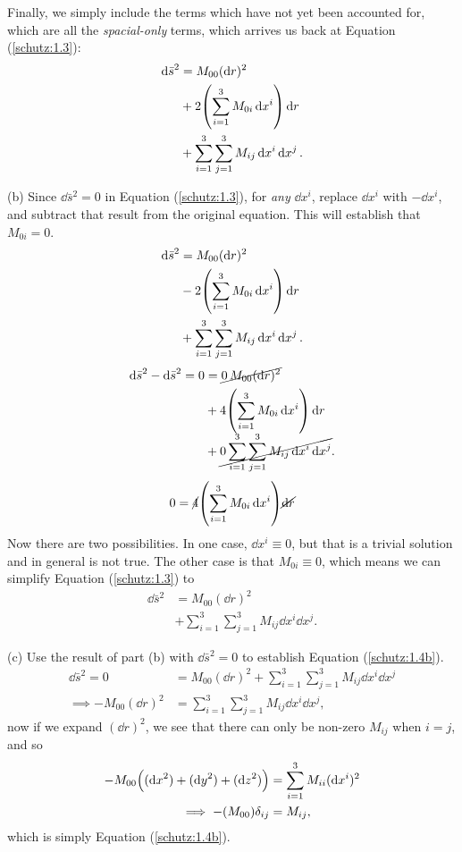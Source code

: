 \documentclass[gr-notes.tex]{subfiles}
\begin{document}
Finally, we simply include the terms which have not yet been accounted for, which are all the \emph{spacial-only} terms, which arrives us back at Equation (\ref{schutz:1.3}):
%
\begin{align*}
  \dd{\bar{s}}^2 &=
  M_{00} (\dd{r})^2
  \\ &+
  2 \qty( \sum_{i=1}^3 M_{0i} \dd{x^i} ) \dd{r}
  \\ &+
  \sum_{i=1}^3 \sum_{j=1}^3 M_{ij} \dd{x^i} \dd{x^j}.
\end{align*}


(b) Since $\dd{\bar{s}}^2 = 0$ in Equation (\ref{schutz:1.3}), for \emph{any} $\dd{x^i}$, replace $\dd{x^i}$ with $-\dd{x^i}$, and subtract that result from the original equation. This will establish that $M_{0i} = 0$.
%
\begin{align*}
  \dd{\bar{s}}^2 &=
  M_{00} (\dd{r})^2
  \\ &-
  2 \qty( \sum_{i=1}^3 M_{0i} \dd{x^i} ) \dd{r}
  \\ &+
  \sum_{i=1}^3 \sum_{j=1}^3 M_{ij} \dd{x^i} \dd{x^j}.
\end{align*}
%
\begin{align*}
  \dd{\bar{s}}^2 - \dd{\bar{s}}^2 = 0 &=
  \cancel{0 \, M_{00} (\dd{r})^2}
  \\ &+
  4 \qty( \sum_{i=1}^3 M_{0i} \dd{x^i} ) \dd{r}
  \\ &+
  \cancel{0 \sum_{i=1}^3 \sum_{j=1}^3 M_{ij} \dd{x^i} \dd{x^j}}.
\end{align*}
%
\begin{displaymath}
  0 = \cancel{4} \qty( \sum_{i=1}^3 M_{0i} \dd{x^i} ) \cancel{\dd{r}}
\end{displaymath}
%
Now there are two possibilities. In one case, $\dd{x^i} \equiv 0$, but that is a trivial solution and in general is not true. The other case is that $M_{0i} \equiv 0$, which means we can simplify Equation (\ref{schutz:1.3}) to
%
\begin{align*}
  \dd{\bar{s}}^2 &=
  M_{00} (\dd{r})^2
  \\ &+
  \sum_{i=1}^3 \sum_{j=1}^3 M_{ij} \dd{x^i} \dd{x^j}.
\end{align*}


(c) Use the result of part (b) with $\dd{\bar{s}}^2 = 0$ to establish Equation (\ref{schutz:1.4b}).
%
\begin{align*}
  \dd{\bar{s}}^2 = 0 &=
  M_{00} (\dd{r})^2 + \sum_{i=1}^3 \sum_{j=1}^3 M_{ij} \dd{x^i} \dd{x^j}
  \\ \implies
  -M_{00} (\dd{r})^2 &=
  \sum_{i=1}^3 \sum_{j=1}^3 M_{ij} \dd{x^i} \dd{x^j},
\end{align*}
%
now if we expand $(\dd{r})^2$, we see that there can only be non-zero $M_{ij}$ when $i = j$, and so
%
\begin{align*}
  -M_{00} \qty( (\dd{x}^2) + (\dd{y}^2) + (\dd{z}^2) ) &=
  \sum_{i=1}^3 M_{ii} (\dd{x^i})^2
  \\ \implies
  -(M_{00}) \delta_{ij} &=
  M_{ij},
\end{align*}
%
which is simply Equation (\ref{schutz:1.4b}).
\end{document}
